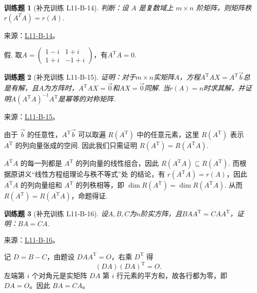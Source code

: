 \documentclass[UTF8,12pt,a4paper,fontset=fandol]{ctexart}
\newtheorem{exercise}{训练题}[section]
\begin{document}
\begin{exercise}[补充训练 L11-B-14]\label{prob:L11-B-14}
判断：设 $A$ 是复数域上 $m \times n$ 阶矩阵，则矩阵秩 $r\left(A^T A\right)=r(A)$.
\end{exercise}
\noindent 来源：\href{https://github.com/yhwu-is/Linear-Algebra-Left-Undone/blob/new/%E8%AE%B2%E4%B9%89/%E4%B8%93%E9%A2%98/11%20%E6%9C%9D%E8%8A%B1%E5%A4%95%E6%8B%BE.tex}{L11-B-14}。
\begin{solve}
假. 取$A=\begin{pmatrix}
                1-i & 1+i  \\
                1+i & -1+i
            \end{pmatrix}$，有$A^\mathrm{T}A=0$.
\end{solve}

\begin{exercise}[补充训练 L11-B-15]\label{prob:L11-B-15}
证明：对于$m \times n$实矩阵$A$，方程$A^\mathrm{T}AX = A^\mathrm{T}\vec{b}$总是有解，且$A$为方阵时，$A^\mathrm{T}AX = \vec{0}$和$AX=\vec{0}$同解. 当$r(A)=n$时求其解，并证明$A(A^\mathrm{T}A)^{-1}A^\mathrm{T}$是幂等的对称矩阵.
\end{exercise}
\noindent 来源：\href{https://github.com/yhwu-is/Linear-Algebra-Left-Undone/blob/new/%E8%AE%B2%E4%B9%89/%E4%B8%93%E9%A2%98/11%20%E6%9C%9D%E8%8A%B1%E5%A4%95%E6%8B%BE.tex}{L11-B-15}。
\begin{solve}
由于 $\vec{b}$ 的任意性，$A^\mathrm{T}\vec{b}$ 可以取遍 $R(A^\mathrm{T})$ 中的任意元素，这里 $R(A^\mathrm{T})$ 表示 $A^\mathrm{T}$ 的列向量张成的空间. 因此我们只需证明 $R(A^\mathrm{T}) = R(A^\mathrm{T}A)$.

            $A^\mathrm{T}A$ 的每一列都是 $A^\mathrm{T}$ 的列向量的线性组合，因此 $R(A^\mathrm{T}A) \subseteq R(A^\mathrm{T})$. 而根据原讲义“线性方程组理论与秩不等式”处 的结论，有 $r(A^\mathrm{T}A) = r(A)$，因此 $A^\mathrm{T}A$ 的列向量组和 $A^\mathrm{T}$ 的列秩相等，即 $\dim R(A^\mathrm{T}) = \dim R(A^\mathrm{T}A)$. 从而 $R(A^\mathrm{T}) = R(A^\mathrm{T}A)$，命题得证.
\end{solve}

\begin{exercise}[补充训练 L11-B-16]\label{prob:L11-B-16}
设$A,B,C$为$n$阶实方阵，且$BAA^\mathrm{T}=CAA^\mathrm{T}$，证明：$BA=CA$.
\end{exercise}
\noindent 来源：\href{https://github.com/yhwu-is/Linear-Algebra-Left-Undone/blob/new/%E8%AE%B2%E4%B9%89/%E4%B8%93%E9%A2%98/11%20%E6%9C%9D%E8%8A%B1%E5%A4%95%E6%8B%BE.tex}{L11-B-16}。
\begin{solve}
记 $D=B-C$，由题设 $DAA^{\mathrm T}=O$，右乘 $D^{\mathrm T}$ 得
\[(DA)(DA)^{\mathrm T}=O.\]
左端第 $i$ 个对角元是实矩阵 $DA$ 第 $i$ 行元素的平方和，故各行都为零，即 $DA=O$。因此 $BA=CA$。
\end{solve}
\end{document}
